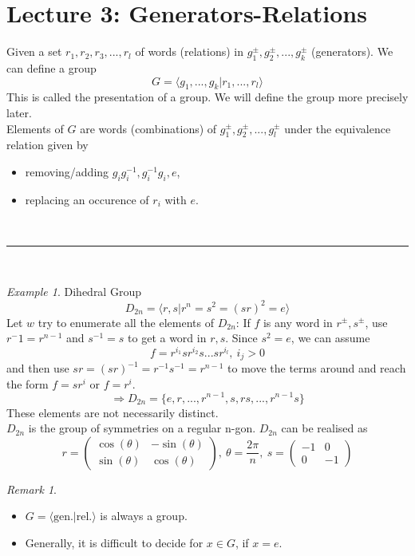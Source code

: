 \documentclass{article}
\theoremstyle{definition}
\theoremstyle{remark}
\newtheorem*{remark}{Remark}
\newtheorem*{example}{Example}
\begin{document}
\section{Lecture 3: Generators-Relations}
Given a set $r_1,r_2,r_3,...,r_l$ of words (relations) in $g_1^{\pm},g_2^{\pm},...,g_k^{\pm}$ (generators). We can define a group 
\begin{equation}
G=\langle g_1,...,g_k|r_1,...,r_l\rangle
\end{equation}
This is called the presentation of a group. We will define the group more precisely later.\\
\indent Elements of $G$ are words (combinations) of $g_1^{\pm},g_2^{\pm},...,g_l^{\pm}$ under the equivalence relation given by 
\begin{itemize}
\item removing/adding $g_ig_i^{-1}, g_i^{-1}g_i,e$,
\item replacing an occurence of $r_i$ with $e$.
\end{itemize}
\vspace{2mm}~\\
\hrule
\vspace{2mm}~\\
\begin{example} Dihedral Group
\begin{equation}
D_{2n}=\langle r,s|r^n=s^2=(sr)^2=e\rangle
\end{equation}
Let $w$ try to enumerate all the elements of $D_{2n}$:
If $f$ is any word in $r^{\pm},s^{\pm}$, use $r^-1=r^{n-1}$ and $s^{-1}=s$ to get a word in $r,s$. Since $s^2=e$, we can assume
\begin{equation}
f=r^{i_1}sr^{i_2}s...sr^{i_l},~i_j>0
\end{equation}
and then use $sr=(sr)^{-1}=r^{-1}s^{-1}=r^{n-1}$ to move the terms around and reach the form $f=sr^i$ or $f=r^i$.\\
\begin{equation}
\Rightarrow D_{2n}=\lbrace e,r,...,r^{n-1},s,rs,...,r^{n-1}s\rbrace
\end{equation}
These elements are not necessarily distinct.\\
\indent $D_{2n}$ is the group of symmetries on a regular n-gon. $D_{2n}$ can be realised as 
\begin{equation}
r=
\begin{pmatrix}
\cos(\theta)&-\sin(\theta)\\
\sin(\theta)&\cos(\theta)
\end{pmatrix}
,~\theta = \frac{2\pi}{n},~s=
\begin{pmatrix}
-1&0\\
0&-1
\end{pmatrix}
\end{equation}
\end{example}
\begin{remark}~
\begin{itemize}
\item $G=\langle \text{gen.}|\text{rel.}\rangle$ is always a group.
\item Generally, it is difficult to decide for $x\in G$, if $x=e$.
\end{itemize}
\end{remark}
\newpage
\end{document}
